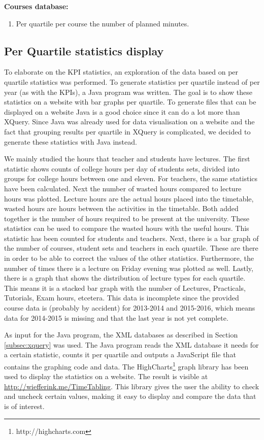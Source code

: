\textbf{Courses database:}
\begin{enumerate}
	\item Per quartile per course the number of planned minutes.
\end{enumerate}

\subsection{Per Quartile statistics display}
To elaborate on the KPI statistics, an exploration of the data based on per quartile statistics was performed. To generate statistics per quartile instead of per year (as with the KPIs), a Java program was written. The goal is to show these statistics on a website with bar graphs per quartile. To generate files that can be displayed on a website Java is a good choice since it can do a lot more than XQuery. Since Java was already used for data visualisation on a website and the fact that grouping results per quartile in XQuery is complicated, we decided to generate these statistics with Java instead.

We mainly studied the hours that teacher and students have lectures. The first statistic shows counts of college hours per day of students sets, divided into groups for college hours between one and eleven. For teachers, the same statistics have been calculated. Next the number of wasted hours compared to lecture hours was plotted. Lecture hours are the actual hours placed into the timetable, wasted hours are hours between the activities in the timetable. Both added together is the number of hours required to be present at the university. These statistics can be used to compare the wasted hours with the useful hours. This statistic has been counted for students and teachers. Next, there is a bar graph of the number of courses, student sets and teachers in each quartile. These are there in order to be able to correct the values of the other statistics. Furthermore, the number of times there is a lecture on Friday evening was plotted as well. Lastly, there is a graph that shows the distribution of lecture types for each quartile. This means it is a stacked bar graph with the number of Lectures, Practicals, Tutorials, Exam hours, etcetera. This data is incomplete since the provided course data is (probably by accident) for 2013-2014 and 2015-2016, which means data for 2014-2015 is missing and that the last year is not yet complete.

As input for the Java program, the XML databases as described in Section \ref{subsec:xquery} was used. The Java program reads the XML database it needs for a certain statistic, counts it per quartile and outputs a JavaScript file that contains the graphing code and data. The HighCharts\footnote{http://highcharts.com} graph library has been used to display the statistics on a website. The result is visible at \url{http://wiefferink.me/TimeTabling}. This library gives the user the ability to check and uncheck certain values, making it easy to display and compare the data that is of interest.





